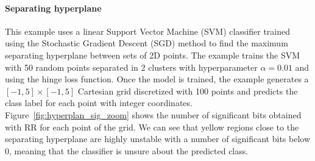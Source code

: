 \documentclass[10pt,journal,compsoc]{IEEEtran}
\begin{document}



\paragraph{Separating hyperplane}

This example uses a linear Support Vector Machine (SVM) classifier trained using
the Stochastic Gradient Descent (SGD) method to find the maximum separating
hyperplane between sets of 2D points. The example trains the SVM with 50 random
points separated in 2 clusters with hyperparameter $\alpha=0.01$ and using the
hinge loss function. Once the model is trained, the example generates a
$[-1,5]\times[-1,5]$ Cartesian grid discretized with 100 points and predicts the
class label for each point with integer coordinates.
Figure~\ref{fig:hyperplan_sig_zoom} shows the number of significant bits
obtained with RR for each point of the grid. 
We can see that yellow regions 
close to the separating hyperplane are highly unstable with a number of
significant bits below 0, meaning that the classifier is unsure about the
predicted class. 


\end{document}
